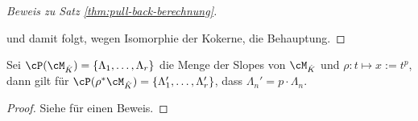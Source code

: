 \begin{proof}[Beweis zu Satz \ref{thm:pull-back-berechnung}]
\begin{center}
\end{center}
und damit folgt, wegen Isomorphie der Kokerne, die Behauptung.
\end{proof}
%
\begin{lem}\label{lem:slope-pb-multiplikation}
Sei $\cP(\cM_{\hat K})=\{\Lambda_1,\dots,\Lambda_r\}$ die Menge der Slopes von
$\cM_{\hat K}$ und $\rho:t\mapsto x:=t^p$, dann gilt für $\cP(\rho^*\cM_{\hat
K})=\{\Lambda_1',\dots,\Lambda_r'\}$, dass $\Lambda_n'=p\cdot\Lambda_n$.
\end{lem}
\begin{proof}
Siehe \cite[5.4.3]{sabbah_cimpa90} für einen Beweis.
\end{proof}
\begin{comment}
\begin{proof}
Sei $\cM_{\hat K}=\cD_{\hat K}\slash \cD_{\hat K}\cdot P$ mit $P=\sum
a_i(x)\partial_x^i$, dann ist
$\rho^*\cM_{\hat K}\cong\cD_{\hat L}\slash \cD_{\hat L}\cdot P'$ mit
\begin{align*}
H(P'(t,\partial_t)) &=H(P(\rho(t),\rho'(t)^{-1}\partial_t))
\\&=H(\sum_i a_i(\rho(t))(\rho'(t)^{-1}\partial_t)^ii)
\\&=H(\sum_i a_i(\rho(t))(\rho'(t)^{-1}\partial_t)^ii)
\\&=H(\sum_i a_i(t^p)((p\cdot t^{p-1})^{-1}\partial_t)^i)
\\&=H(\sum_i a_i(t^p)(p\cdot t^{p-1})^{-i}\partial_t^i)
\\&=H(\sum_i a_i(t^p)t^{-i(p-1)}\partial_t^i)
\\&=\dots %
\end{align*}
\end{proof}
\end{comment}
%

